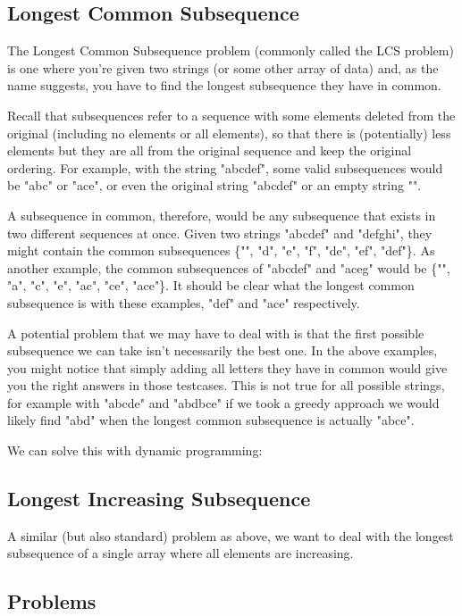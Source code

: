 
\subsection{Longest Common Subsequence}

The Longest Common Subsequence problem (commonly called the LCS problem) is one where you're given two strings (or some other array of data) and, as the name suggests, you have to find the longest subsequence they have in common.

Recall that subsequences refer to a sequence with some elements deleted from the original (including no elements or all elements), so that there is (potentially) less elements but they are all from the original sequence and keep the original ordering. For example, with the string "abcdef", some valid subsequences would be "abc" or "ace", or even the original string "abcdef" or an empty string "".

A subsequence in common, therefore, would be any subsequence that exists in two different sequences at once. Given two strings "abcdef" and "defghi", they might contain the common subsequences \{"", "d", "e", "f", "de", "ef", "def"\}. As another example, the common subsequences of "abcdef" and "aceg" would be \{"", "a", "c", "e", "ac", "ce", "ace"\}. It should be clear what the longest common subsequence is with these examples, "def" and "ace" respectively.

A potential problem that we may have to deal with is that the first possible subsequence we can take isn't necessarily the best one. In the above examples, you might notice that simply adding all letters they have in common would give you the right answers in those testcases. This is not true for all possible strings, for example with "abcde" and "abdbce" if we took a greedy approach we would likely find "abd" when the longest common subsequence is actually "abce".

We can solve this with dynamic programming:


\subsection{Longest Increasing Subsequence}

A similar (but also standard) problem as above, we want to deal with the longest subsequence of a single array where all elements are increasing.


\subsection{Problems}



\hrulefill



\hrulefill